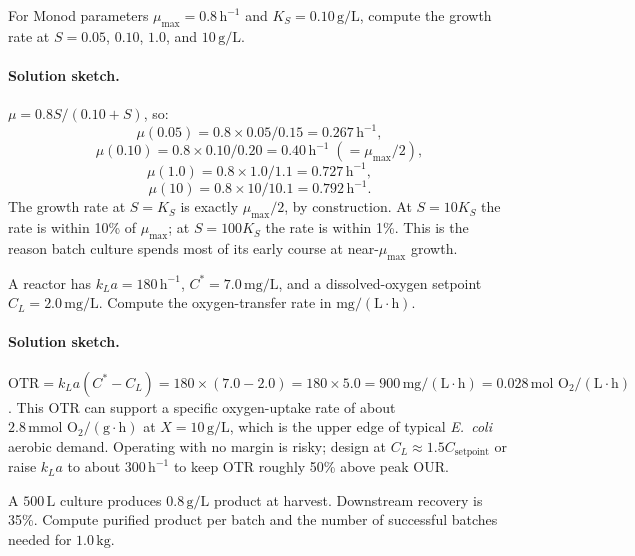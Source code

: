 \begin{exercise}
For Monod parameters $\mu_{\max}=0.8\,\text{h}^{-1}$ and
$K_S=0.10\,\text{g}/\text{L}$, compute the growth rate at
$S=0.05$, $0.10$, $1.0$, and $10\,\text{g}/\text{L}$.
\end{exercise}

\paragraph{Solution sketch.}
$\mu = 0.8 S / (0.10 + S)$, so:
\[
\mu(0.05) = 0.8 \times 0.05/0.15 = 0.267\,\text{h}^{-1},
\]
\[
\mu(0.10) = 0.8 \times 0.10/0.20 = 0.40\,\text{h}^{-1} \;(= \mu_{\max}/2),
\]
\[
\mu(1.0)  = 0.8 \times 1.0/1.1   = 0.727\,\text{h}^{-1},
\]
\[
\mu(10)   = 0.8 \times 10/10.1   = 0.792\,\text{h}^{-1}.
\]
The growth rate at $S = K_S$ is exactly $\mu_{\max}/2$, by construction.
At $S = 10 K_S$ the rate is within 10\% of $\mu_{\max}$; at
$S = 100 K_S$ the rate is within 1\%. This is the reason batch culture
spends most of its early course at near-$\mu_{\max}$ growth.

\begin{exercise}
A reactor has $k_La = 180\,\text{h}^{-1}$, $C^\ast =
7.0\,\text{mg}/\text{L}$, and a dissolved-oxygen setpoint
$C_L = 2.0\,\text{mg}/\text{L}$. Compute the oxygen-transfer rate in
$\text{mg}/(\text{L}\cdot\text{h})$.
\end{exercise}

\paragraph{Solution sketch.}
$\text{OTR} = k_L a (C^\ast - C_L)
= 180 \times (7.0 - 2.0)
= 180 \times 5.0
= 900\,\text{mg}/(\text{L}\cdot\text{h})
= 0.028\,\text{mol O}_2/(\text{L}\cdot\text{h})$.
This OTR can support a specific oxygen-uptake rate of about
$2.8\,\text{mmol O}_2/(\text{g}\cdot\text{h})$ at $X = 10\,\text{g}/\text{L}$,
which is the upper edge of typical \emph{E.\ coli} aerobic demand.
Operating with no margin is risky; design at $C_L \approx 1.5
C_{\text{setpoint}}$ or raise $k_L a$ to about
$300\,\text{h}^{-1}$ to keep OTR roughly 50\% above peak OUR.

\begin{exercise}
A $500\,\text{L}$ culture produces $0.8\,\text{g}/\text{L}$ product at
harvest. Downstream recovery is 35\%. Compute purified product per
batch and the number of successful batches needed for $1.0\,\text{kg}$.
\end{exercise}

